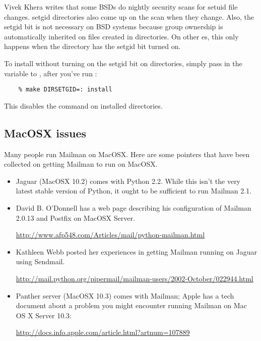 \documentclass{howto}
\begin{document}
Vivek Khera writes that some BSDs do nightly security scans for setuid file
changes.  setgid directories also come up on the scan when they change.  Also,
the setgid bit is not necessary on BSD systems because group ownership is
automatically inherited on files created in directories.  On other \UNIX{}es,
this only happens when the directory has the setgid bit turned on.

To install without turning on the setgid bit on directories, simply pass in
the  variable to , after you've run
:

\begin{verbatim}
    % make DIRSETGID=: install
\end{verbatim}

This disables the  command on installed directories.

\subsection{MacOSX issues}

Many people run Mailman on MacOSX.  Here are some pointers that have been
collected on getting Mailman to run on MacOSX.

\begin{itemize}
\item Jaguar (MacOSX 10.2) comes with Python 2.2.  While this isn't the very
      latest stable version of Python, it ought to be sufficient to run
      Mailman 2.1.

\item David B. O'Donnell has a web page describing his configuration of
      Mailman 2.0.13 and Postfix on MacOSX Server.

      \url{http://www.afp548.com/Articles/mail/python-mailman.html}

\item Kathleen Webb posted her experiences in getting Mailman running on
      Jaguar using Sendmail.

      \url{http://mail.python.org/pipermail/mailman-users/2002-October/022944.html}

\item Panther server (MacOSX 10.3) comes with Mailman; Apple has a tech
      document about a problem you might encounter running Mailman on Mac OS X
      Server 10.3:

      \url{http://docs.info.apple.com/article.html?artnum=107889}
\end{itemize}
\end{document}
